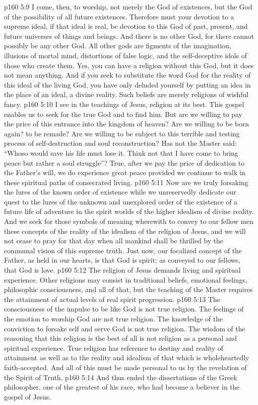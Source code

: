 \vs p160 5:9 I come, then, to worship, not merely the God of existences, but the God of the possibility of all future existences. Therefore must your devotion to a supreme ideal, if that ideal is real, be devotion to this God of past, present, and future universes of things and beings. And there is no other God, for there cannot possibly be any other God. All other gods are figments of the imagination, illusions of mortal mind, distortions of false logic, and the self\hyp{}deceptive idols of those who create them. Yes, you can have a religion without this God, but it does not mean anything. And if you seek to substitute the word God for the reality of this ideal of the living God, you have only deluded yourself by putting an idea in the place of an ideal, a divine reality. Such beliefs are merely religions of wishful fancy.
\vs p160 5:10 I see in the teachings of Jesus, religion at its best. This gospel enables us to seek for the true God and to find him. But are we willing to pay the price of this entrance into the kingdom of heaven? Are we willing to be born again? to be remade? Are we willing to be subject to this terrible and testing process of self\hyp{}destruction and soul reconstruction? Has not the Master said: \textcolor{ubdarkred}{“Whoso would save his life must lose it. Think not that I have come to bring peace but rather a soul struggle”?} True, after we pay the price of dedication to the Father’s will, we do experience great peace provided we continue to walk in these spiritual paths of consecrated living.
\vs p160 5:11 Now are we truly forsaking the lures of the known order of existence while we unreservedly dedicate our quest to the lures of the unknown and unexplored order of the existence of a future life of adventure in the spirit worlds of the higher idealism of divine reality. And we seek for those symbols of meaning wherewith to convey to our fellow men these concepts of the reality of the idealism of the religion of Jesus, and we will not cease to pray for that day when all mankind shall be thrilled by the communal vision of this supreme truth. Just now, our focalized concept of the Father, as held in our hearts, is that God is spirit; as conveyed to our fellows, that God is love.
\vs p160 5:12 The religion of Jesus demands living and spiritual experience. Other religions may consist in traditional beliefs, emotional feelings, philosophic consciousness, and all of that, but the teaching of the Master requires the attainment of actual levels of real spirit progression.
\vs p160 5:13 The consciousness of the impulse to be like God is not true religion. The feelings of the emotion to worship God are not true religion. The knowledge of the conviction to forsake self and serve God is not true religion. The wisdom of the reasoning that this religion is the best of all is not religion as a personal and spiritual experience. True religion has reference to destiny and reality of attainment as well as to the reality and idealism of that which is wholeheartedly faith\hyp{}accepted. And all of this must be made personal to us by the revelation of the Spirit of Truth.
\pc \vs p160 5:14 And thus ended the dissertations of the Greek philosopher, one of the greatest of his race, who had become a believer in the gospel of Jesus.
